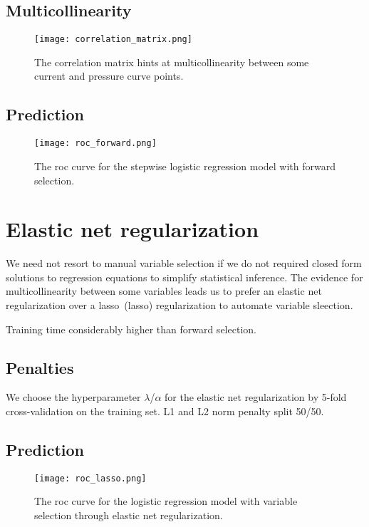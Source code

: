 \subsection{Multicollinearity}

\begin{figure}
  \texttt{[image: correlation\_matrix.png]}
  \caption{The correlation matrix hints at multicollinearity between some current and pressure curve points.}
  \label{fig:correlation-matrix}
\end{figure}

\subsection{Prediction}

\begin{figure}
  \texttt{[image: roc\_forward.png]}
  \caption{The \acrshort{roc} curve for the stepwise logistic regression model with forward selection.}
  \label{fig:roc-forward}
\end{figure}

\section{Elastic net regularization}

We need not resort to manual variable selection if we do not required closed form solutions to regression equations to simplify statistical inference.
The evidence for multicollinearity between some variables leads us to prefer an elastic net regularization over a \acrlong{lasso}~(\acrshort{lasso}) regularization to automate variable sleection.

Training time considerably higher than forward selection.

\subsection{Penalties}

We choose the hyperparameter $\lambda$/$\alpha$ for the elastic net regularization by 5-fold cross-validation on the training set.
L1 and L2 norm penalty split 50/50.

\subsection{Prediction}

\begin{figure}
  \texttt{[image: roc\_lasso.png]}
  \caption{The \acrshort{roc} curve for the logistic regression model with variable selection through elastic net regularization.}
  \label{fig:roc-forward}
\end{figure}

